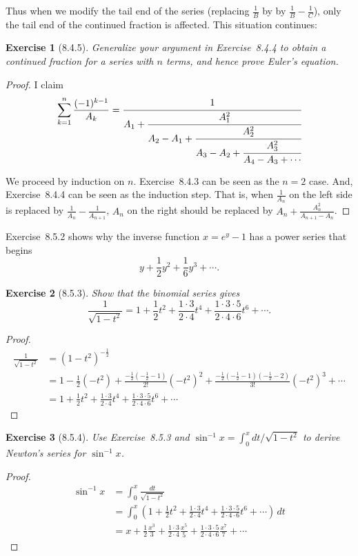 \documentclass[12pt]{article}
\theoremstyle{plain}
\newtheorem{ex}{Exercise}
\begin{document}
Thus when we modify the tail end of the series (replacing $\frac{1}{B}$ by by $\frac{1}{B}-\frac{1}{C}$), only the tail end of the continued fraction is affected. This situation continues:

\begin{ex} [8.4.5]
  Generalize your argument in Exercise~8.4.4 to obtain a continued fraction for a series with $n$ terms, and hence prove Euler's equation.
\end{ex}

\begin{proof}
  I claim
  \[
    \sum_{k=1}^n\frac{(-1)^{k-1}}{A_k}=\cfrac{1}{A_1+\cfrac{A_1^2}{A_2-A_1+\cfrac{A_2^2}{A_3-A_2+\cfrac{A_3^2}{A_4-A_3+\cdots}}}}
  \]

  We proceed by induction on $n$. Exercise~8.4.3 can be seen as the $n=2$ case. And, Exercise~8.4.4 can be seen as the induction step. That is, when $\frac{1}{A_n}$ on the left side is replaced by $\frac{1}{A_n}-\frac{1}{A_{n+1}}$, $A_n$ on the right should be replaced by $A_n+\frac{A_n^2}{A_{n+1}-A_n}$.
\end{proof}

Exercise~8.5.2 shows why the inverse function $x=e^y-1$ has a power series that begins
\[
  y+\frac{1}{2}y^2+\frac{1}{6}y^3+\cdots.
\]

\begin{ex} [8.5.3]
  Show that the binomial series gives
  \[
    \frac{1}{\sqrt{1-t^2}}=1+\frac{1}{2}t^2+\frac{1\cdot3}{2\cdot4}t^4+\frac{1\cdot3\cdot5}{2\cdot4\cdot6}t^6+\cdots.
  \]
\end{ex}

\begin{proof}
  \begin{align*}
    \frac{1}{\sqrt{1-t^2}} &= (1-t^2)^{-\frac{1}{2}} \\
    &= 1-\frac{1}{2}(-t^2)+\frac{-\frac{1}{2}\left(-\frac{1}{2}-1\right)}{2!}(-t^2)^2+\frac{-\frac{1}{2}\left(-\frac{1}{2}-1\right)\left(-\frac{1}{2}-2\right)}{3!}(-t^2)^3+\cdots \\
    &= 1+\frac{1}{2}t^2+\frac{1\cdot3}{2\cdot4}t^4+\frac{1\cdot3\cdot5}{2\cdot4\cdot6}t^6+\cdots
  \end{align*}
\end{proof}

\begin{ex} [8.5.4]
  Use Exercise~8.5.3 and $\sin^{-1}x=\int_0^xdt/\sqrt{1-t^2}$ to derive Newton's series for $\sin^{-1}x$.
\end{ex}

\begin{proof}
  \begin{align*}
    \sin^{-1}x &= \int_0^x\frac{dt}{\sqrt{1-t^2}} \\
    &= \int_0^x\left(1+\frac{1}{2}t^2+\frac{1\cdot3}{2\cdot4}t^4+\frac{1\cdot3\cdot5}{2\cdot4\cdot6}t^6+\cdots\right)\,dt \\
    &= x+\frac{1}{2}\frac{x^3}{3}+\frac{1\cdot3}{2\cdot4}\frac{x^5}{5}+\frac{1\cdot3\cdot5}{2\cdot4\cdot6}\frac{x^7}{7}+\cdots
  \end{align*}
\end{proof}
\end{document}
